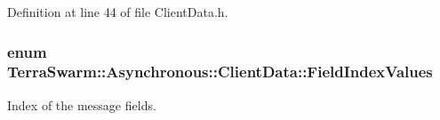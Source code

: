 Definition at line 44 of file Client\-Data.\-h.

\hypertarget{class_terra_swarm_1_1_asynchronous_1_1_client_data_aa673343abbf055d48820fa210064a1db}{
\subsubsection[{Field\-Index\-Values}]{\setlength{\rightskip}{0pt plus 5cm}enum {\bf Terra\-Swarm\-::\-Asynchronous\-::\-Client\-Data\-::\-Field\-Index\-Values}\hspace{0.3cm}{\ttfamily [private]}}}\label{class_terra_swarm_1_1_asynchronous_1_1_client_data_aa673343abbf055d48820fa210064a1db}


Index of the message fields. 

